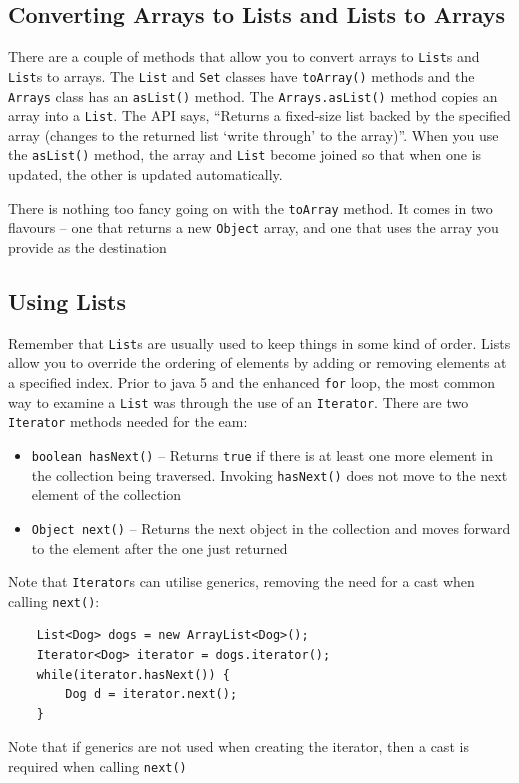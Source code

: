 \subsection{Converting Arrays to Lists and Lists to Arrays}
There are a couple of methods that allow you to convert arrays to \verb#List#s 
and \verb#List#s to arrays. The \verb#List# and \verb#Set# classes have 
\verb#toArray()# methods and the \verb#Arrays# class has an \verb#asList()# 
method. The \verb#Arrays.asList()# method copies an array into a \verb#List#.  
The API says, ``Returns a fixed-size list backed by the specified array 
(changes to the returned list `write through' to the array)''. When you use the 
\verb#asList()# method, the array and \verb#List# become joined so that when 
one is updated, the other is updated automatically.

There is nothing too fancy going on with the \verb#toArray# method. It comes in 
two flavours -- one that returns a new \verb#Object# array, and one that uses 
the array you provide as the destination

\subsection{Using Lists}
Remember that \verb#List#s are usually used to keep things in some kind of 
order. Lists allow you to override the ordering of elements by adding or 
removing elements at a specified index. Prior to java 5 and the enhanced 
\verb#for# loop, the most common way to examine a \verb#List# was through the 
use of an \verb#Iterator#. There are two \verb#Iterator# methods needed for the 
eam:
\begin{itemize}
    \item \verb#boolean hasNext()# -- Returns \verb#true# if there is at least 
    one more element in the collection being traversed. Invoking 
    \verb#hasNext()# does not move to the next element of the collection
    \item \verb#Object next()# -- Returns the next object in the collection and 
    moves forward to the element after the one just returned
\end{itemize}
Note that \verb#Iterator#s can utilise generics, removing the need for a cast 
when calling \verb#next()#:
\begin{verbatim}
    List<Dog> dogs = new ArrayList<Dog>();
    Iterator<Dog> iterator = dogs.iterator();
    while(iterator.hasNext()) {
        Dog d = iterator.next();
    }
\end{verbatim}
Note that if generics are not used when creating the iterator, then a cast is 
required when calling \verb#next()#


